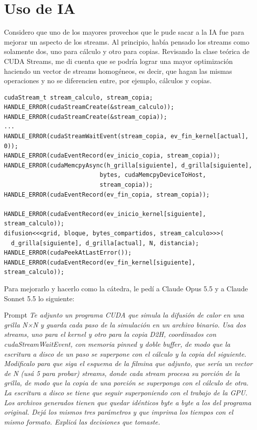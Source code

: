 \section{Uso de IA}
Considero que uno de los mayores provechos que le pude sacar a la IA fue para mejorar un aspecto de los streams. Al principio, había pensado los streams como solamente dos, uno para cálculo y otro para copias.
Revisando la clase teórica de CUDA Streams, me di cuenta que se podría lograr una mayor optimización haciendo un vector de streams homogéneos, es decir, que hagan las mismas operaciones y no se diferencien entre, por ejemplo, cálculos y copias.

\begin{lstlisting}
cudaStream_t stream_calculo, stream_copia;
HANDLE_ERROR(cudaStreamCreate(&stream_calculo));
HANDLE_ERROR(cudaStreamCreate(&stream_copia));
...
HANDLE_ERROR(cudaStreamWaitEvent(stream_copia, ev_fin_kernel[actual], 0));
HANDLE_ERROR(cudaEventRecord(ev_inicio_copia, stream_copia));
HANDLE_ERROR(cudaMemcpyAsync(h_grilla[siguiente], d_grilla[siguiente],
                           bytes, cudaMemcpyDeviceToHost,
                           stream_copia));
HANDLE_ERROR(cudaEventRecord(ev_fin_copia, stream_copia));

HANDLE_ERROR(cudaEventRecord(ev_inicio_kernel[siguiente], stream_calculo));
difusion<<<grid, bloque, bytes_compartidos, stream_calculo>>>(
  d_grilla[siguiente], d_grilla[actual], N, distancia);
HANDLE_ERROR(cudaPeekAtLastError());
HANDLE_ERROR(cudaEventRecord(ev_fin_kernel[siguiente], stream_calculo));
\end{lstlisting}

Para mejorarlo y hacerlo como la cátedra, le pedí a Claude Opus 5.5 y a Claude Sonnet 5.5 lo siguiente:

\begin{block}{Prompt}
\textit{Te adjunto un programa CUDA que simula la difusión de calor en una grilla N×N y guarda cada paso de la simulación en un archivo binario. Usa dos streams, uno para el kernel y otro para la copia D2H, coordinados con cudaStreamWaitEvent, con memoria pinned y doble buffer, de modo que la escritura a disco de un paso se superpone con el cálculo y la copia del siguiente. Modificalo para que siga el esquema de la filmina que adjunto, que sería un vector de N (usá 5 para probar) streams, donde cada stream procesa su porción de la grilla, de modo que la copia de una porción se superponga con el cálculo de otra. La escritura a disco se tiene que seguir superponiendo con el trabajo de la GPU. Los archivos generados tienen que quedar idénticos byte a byte a los del programa original. Dejá los mismos tres parámetros y que imprima los tiempos con el mismo formato. Explicá las decisiones que tomaste.}
\end{block}

